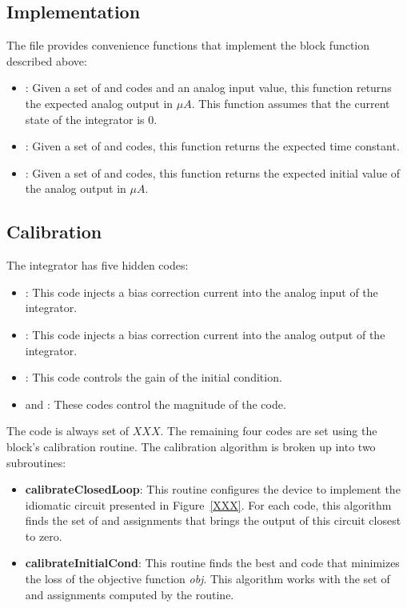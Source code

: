 \begin{algorithmic}
\end{algorithmic}

\subsection{\analoglib Implementation}
The  file provides convenience functions that implement the block
function described above:
\begin{itemize}
\item{}: Given a set of \static and \dynamic codes and an
  analog input value, this function returns the expected analog output in $\mu A$. This
  function assumes that the current state of the integrator is 0.
\item{}: Given a set of \static and \dynamic codes,
  this function returns the expected time constant.
\item{}: Given a set of \static and \dynamic codes, this
  function returns the expected initial value of the analog output in $\mu
      A$.
\end{itemize}

\subsection{Calibration}
The integrator has five hidden codes:
\begin{itemize}
  \item{}: This code injects a bias correction current into the
    analog input of the integrator.
  \item{}: This code injects a bias correction current into the
    analog output of the integrator.
  \item{}: This code controls the gain of the initial condition.
  \item{} and : These codes control the magnitude of the
     code.
\end{itemize}

The  code is always set of $XXX$. The remaining four codes are set using the block's calibration routine. The
calibration algorithm is broken up into two subroutines:
\begin{itemize}
\item\textbf{calibrateClosedLoop}: This routine configures the device to implement the
  idiomatic circuit presented in Figure~\ref{XXX}. For each  code, this
  algorithm finds the set of  and 
  assignments that brings the output of this circuit closest to zero.
\item\textbf{calibrateInitialCond}: This routine finds the best  and
   code that minimizes the loss of the objective function
  \textit{obj}. This algorithm works with the set of  and
   assignments computed by the  routine. 
\end{itemize}

